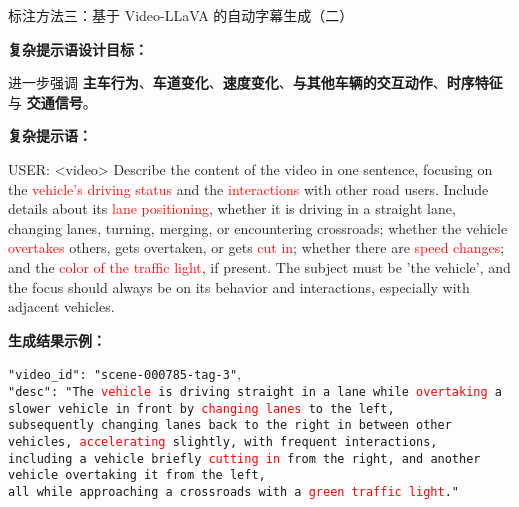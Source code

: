 \documentclass[serif]{beamer}
\begin{document}
\begin{frame}{标注方法三：基于 Video-LLaVA 的自动字幕生成（二）}

\normalsize
\textbf{复杂提示语设计目标：}

\vspace{0.2em}
进一步强调 \textbf{主车行为}、\textbf{车道变化}、\textbf{速度变化}、\textbf{与其他车辆的交互动作}、\textbf{时序特征} 与 \textbf{交通信号}。

\vspace{0.2em}
\textbf{复杂提示语：}

\scriptsize
USER: <video> Describe the content of the video in one sentence, focusing on the \textcolor{red}{vehicle's driving status} and the \textcolor{red}{interactions} with other road users. Include details about its \textcolor{red}{lane positioning}, whether it is driving in a straight lane, changing lanes, turning, merging, or encountering crossroads; whether the vehicle \textcolor{red}{overtakes} others, gets overtaken, or gets \textcolor{red}{cut in}; whether there are \textcolor{red}{speed changes}; and the \textcolor{red}{color of the traffic light}, if present. The subject must be 'the vehicle', and the focus should always be on its behavior and interactions, especially with adjacent vehicles.

\vspace{0.2em}
\normalsize
\textbf{生成结果示例：}

\scriptsize
\texttt{"video\_id": "scene-000785-tag-3"},\\
\texttt{"desc": "The \textcolor{red}{vehicle} is driving straight in a lane while \textcolor{red}{overtaking} a slower vehicle in front by \textcolor{red}{changing lanes} to the left,}\\
\texttt{subsequently changing lanes back to the right in between other vehicles, \textcolor{red}{accelerating} slightly, with frequent interactions,}\\
\texttt{including a vehicle briefly \textcolor{red}{cutting in} from the right, and another vehicle overtaking it from the left,}\\
\texttt{all while approaching a crossroads with a \textcolor{red}{green traffic light}."}

\end{frame}
\end{document}
